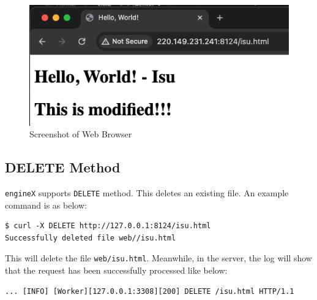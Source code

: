 \documentclass{homework}
\begin{document}
\begin{figure}[h]
\begin{center}
\includegraphics[scale=0.6]{8_ss5.png}    
\caption{Screenshot of Web Browser}
\end{center}
\end{figure}

\pagebreak

\subsection{DELETE Method}
\texttt{engineX} supports \texttt{DELETE} method. This deletes an existing file. An example command is as below:
\\
\begin{center}
\begin{code}
\begin{verbatim}
$ curl -X DELETE http://127.0.0.1:8124/isu.html
Successfully deleted file web//isu.html
\end{verbatim}
\end{code}
\end{center}

This will delete the file \texttt{web/isu.html}. Meanwhile, in the server, the log will show that the request has been successfully processed like below:
\\
\begin{center}
\begin{code}
\begin{verbatim}
... [INFO] [Worker][127.0.0.1:3308][200] DELETE /isu.html HTTP/1.1
\end{verbatim}
\end{code}
\end{center}
\end{document}
